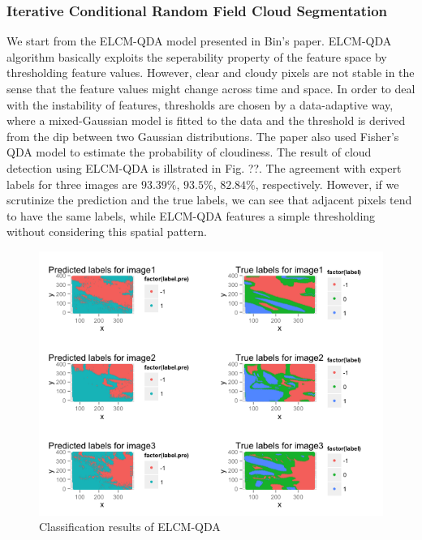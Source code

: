\documentclass[english]{article}\usepackage{graphicx, color}
\numberwithin{equation}{section}
\numberwithin{figure}{section}
\begin{document}
\subsubsection{Iterative Conditional Random Field Cloud Segmentation}
We start from the ELCM-QDA model presented in Bin's paper. ELCM-QDA algorithm basically exploits the seperability property of the feature space by thresholding feature values. However, clear and cloudy pixels are not stable in the sense that the feature values might change across time and space. In order to deal with the instability of features, thresholds are chosen by a data-adaptive way, where a mixed-Gaussian model is fitted to the data and the threshold is derived from the dip between two Gaussian distributions. The paper also used Fisher's QDA model to estimate the probability of cloudiness. The result of cloud detection using ELCM-QDA is illstrated in Fig. ??. The agreement with expert labels for three images are $93.39\%$, $93.5\%$, $82.84\%$, respectively. However, if we scrutinize the prediction and the true labels, we can  see that adjacent pixels tend to have the same labels, while ELCM-QDA features a simple thresholding without considering this spatial pattern.\\
\begin{figure}[!h]
  \begin{center}
    \includegraphics[width=\columnwidth]{figures/ELCMQDA.png}
  \end{center}
  \caption{Classification results of ELCM-QDA}
  \label{fig:ELCM}
\end{figure}
\end{document}
